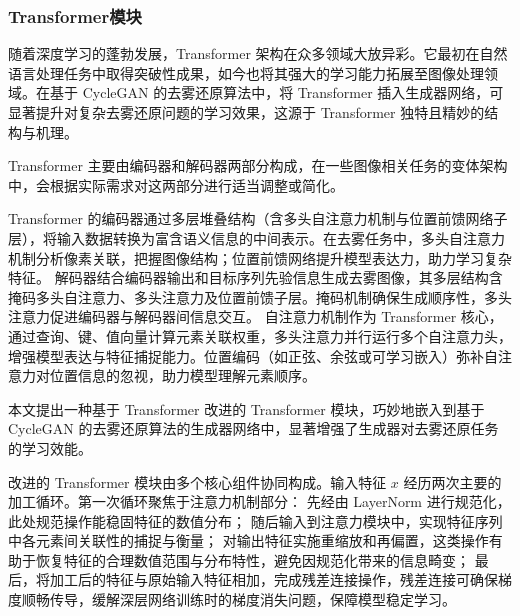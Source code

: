 \subsubsection{Transformer模块}

随着深度学习的蓬勃发展，Transformer 架构在众多领域大放异彩。它最初在自然语言处理任务中取得突破性成果，如今也将其强大的学习能力拓展至图像处理领域。在基于 CycleGAN 的去雾还原算法中，将 Transformer 插入生成器网络，可显著提升对复杂去雾还原问题的学习效果，这源于 Transformer 独特且精妙的结构与机理。

Transformer 主要由编码器和解码器两部分构成，在一些图像相关任务的变体架构中，会根据实际需求对这两部分进行适当调整或简化。


Transformer 的编码器通过多层堆叠结构（含多头自注意力机制与位置前馈网络子层），将输入数据转换为富含语义信息的中间表示。在去雾任务中，多头自注意力机制分析像素关联，把握图像结构；位置前馈网络提升模型表达力，助力学习复杂特征。
解码器结合编码器输出和目标序列先验信息生成去雾图像，其多层结构含掩码多头自注意力、多头注意力及位置前馈子层。掩码机制确保生成顺序性，多头注意力促进编码器与解码器间信息交互。
自注意力机制作为 Transformer 核心，通过查询、键、值向量计算元素关联权重，多头注意力并行运行多个自注意力头，增强模型表达与特征捕捉能力。位置编码（如正弦、余弦或可学习嵌入）弥补自注意力对位置信息的忽视，助力模型理解元素顺序。

本文提出一种基于 Transformer 改进的 Transformer 模块，巧妙地嵌入到基于 CycleGAN 的去雾还原算法的生成器网络中，显著增强了生成器对去雾还原任务的学习效能。

\begin{figure}[htb]
    \centering
    \captionsetup{font=footnotesize}
    \label{fig:transformer}
\end{figure}

改进的 Transformer 模块由多个核心组件协同构成。输入特征 $x$ 经历两次主要的加工循环。第一次循环聚焦于注意力机制部分：
先经由 LayerNorm 进行规范化，此处规范操作能稳固特征的数值分布；
随后输入到注意力模块中，实现特征序列中各元素间关联性的捕捉与衡量；
对输出特征实施重缩放和再偏置，这类操作有助于恢复特征的合理数值范围与分布特性，避免因规范化带来的信息畸变；
最后，将加工后的特征与原始输入特征相加，完成残差连接操作，残差连接可确保梯度顺畅传导，缓解深层网络训练时的梯度消失问题，保障模型稳定学习。

